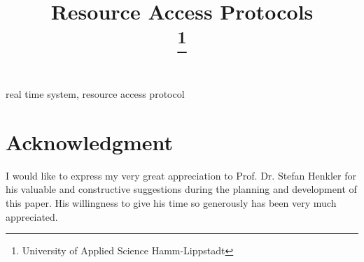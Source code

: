 \documentclass[conference]{IEEEtran}
\begin{document}
\title{Resource Access Protocols\\
{\footnotesize }
\thanks{University of Applied Science Hamm-Lippstadt}
}

\author{

}

\maketitle


\begin{IEEEkeywords}
real time system, resource access protocol 
\end{IEEEkeywords}














\section*{Acknowledgment}

I would like to express my very great appreciation to Prof. Dr. Stefan Henkler  for his valuable and constructive suggestions during the planning and development of this paper. His willingness to give his time so generously has been very much appreciated.




 
\cite{*}
\end{document}
